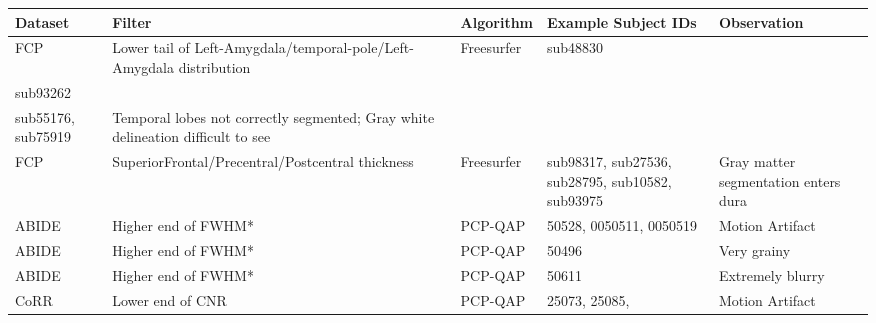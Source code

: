 \begin{tabular}{ | l | p{5cm} | l | p{5cm} | p{5cm} | }
\hline
	Dataset & Filter & Algorithm & Example Subject IDs & Observation \\ \hline
	FCP & Lower tail of Left-Amygdala/temporal-pole/Left-Amygdala distribution & Freesurfer & sub48830\\ sub93262\\ sub55176, sub75919 & Temporal lobes not correctly segmented; Gray white delineation difficult to see \\ \hline
	FCP & SuperiorFrontal/Precentral/Postcentral thickness & Freesurfer & sub98317, sub27536, sub28795, sub10582, sub93975 & Gray matter segmentation enters dura \\ \hline
	ABIDE & Higher end of FWHM* & PCP-QAP & 50528, 0050511, 0050519 & Motion Artifact \\ \hline
	ABIDE & Higher end of FWHM* & PCP-QAP & 50496 & Very grainy \\ \hline
	ABIDE & Higher end of FWHM* & PCP-QAP & 50611 & Extremely blurry \\ \hline
	CoRR & Lower end of CNR & PCP-QAP & 25073, 25085, & Motion Artifact \\ \hline

\end{tabular}
